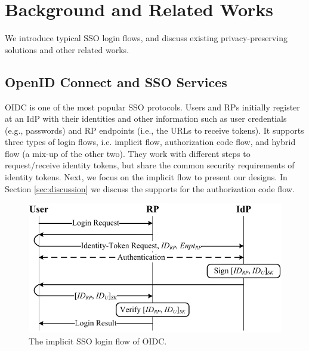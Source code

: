 \section{Background and Related Works}
\label{sec:background}

We introduce %
typical SSO login flows, and discuss existing privacy-preserving solutions and other related works.

\subsection{OpenID Connect and SSO Services}
\label{subsec:OIDC}
OIDC is one of the most popular SSO protocols.
Users and RPs initially register at an IdP with their identities
and other information such as user credentials (e.g., passwords)
and RP endpoints (i.e., the URLs to receive tokens).
It supports three types of login flows, i.e. implicit flow, authorization code flow, and hybrid flow (a mix-up of the other two).
They work with different steps to request/receive identity tokens, but share the common security requirements of identity tokens.
Next, we focus on the implicit flow to present our designs. In Section \ref{sec:discussion} we discuss the supports for the authorization code flow.

\begin{figure}[t]
  \centering
  \includegraphics[width=0.9\linewidth]{fig/OIDC1.pdf}
  \caption{The implicit SSO login flow of OIDC.}
  \label{fig:OpenID}
\end{figure}


